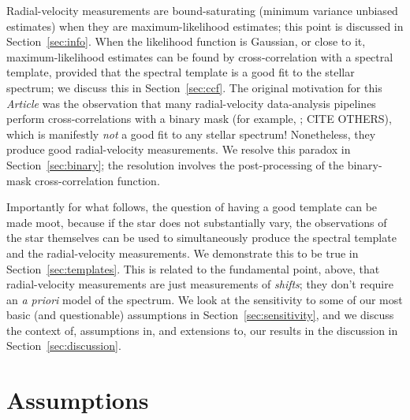 \documentclass[modern]{aastex631}
\newcommand{\documentname}{\textsl{Article}}
\newcommand{\sectionname}{Section}
\newcommand{\secref}[1]{\sectionname~\ref{#1}}
\newcommand{\foreign}[1]{\textsl{#1}}
\begin{document}
Radial-velocity measurements are bound-saturating (minimum variance unbiased estimates) when they are maximum-likelihood estimates; this point is discussed in \secref{sec:info}.
When the likelihood function is Gaussian, or close to it, maximum-likelihood estimates can be found by cross-correlation with a spectral template, provided that the spectral template is a good fit to the stellar spectrum; we discuss this in \secref{sec:ccf}.
The original motivation for this \documentname{} was the observation that many radial-velocity data-analysis pipelines perform cross-correlations with a binary mask (for example, \citealt{pepe}; CITE OTHERS), which is manifestly \emph{not} a good fit to any stellar spectrum!
Nonetheless, they produce good radial-velocity measurements.
We resolve this paradox in \secref{sec:binary}; the resolution involves the post-processing of the binary-mask cross-correlation function.

Importantly for what follows, the question of having a good template can be made moot, because if the star does not substantially vary, the observations of the star themselves can be used to simultaneously produce the spectral template and the radial-velocity measurements.
We demonstrate this to be true in \secref{sec:templates}.
This is related to the fundamental point, above, that radial-velocity measurements are just measurements of \emph{shifts}; they don't require an \foreign{a priori} model of the spectrum.
We look at the sensitivity to some of our most basic (and questionable) assumptions in \secref{sec:sensitivity}, and we discuss the context of, assumptions in, and extensions to, our results in the discussion in \secref{sec:discussion}.

\section{Assumptions}\label{sec:assumptions}
\end{document}
